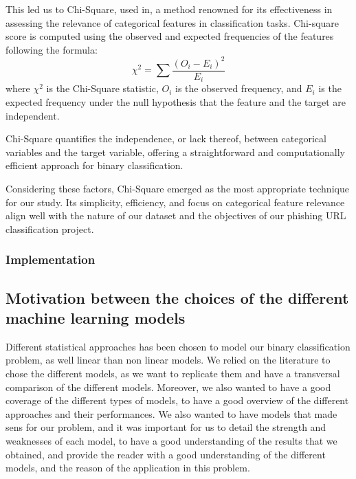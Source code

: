 \documentclass{article}
\begin{document}
    This led us to Chi-Square, used in\cite{LexicalFeatureSelection}, a method renowned for its effectiveness in assessing the relevance of categorical features in classification tasks.
    Chi-square score is computed using the observed and expected frequencies of the features following the formula:
    \begin{equation}
        \chi^2 = \sum \frac{(O_i - E_i)^2}{E_i}\label{eq:equation}
    \end{equation}
    where \( \chi^2 \) is the Chi-Square statistic, \( O_i \) is the observed frequency, and \( E_i \) is the expected frequency under the null hypothesis that the feature and the target are independent.

    Chi-Square quantifies the independence, or lack thereof, between categorical variables and the target variable, offering a straightforward and computationally efficient approach for binary classification.

    Considering these factors, Chi-Square emerged as the most appropriate technique for our study.
    Its simplicity, efficiency, and focus on categorical feature relevance align well with the nature of our dataset and the objectives of our phishing URL classification project.



    \subsubsection{Implementation}\label{subsubsec:implementation}


    \subsection{Motivation between the choices of the different machine learning models}\label{subsec:motivation-between-the-choices-of-the-different-machine-learning-models2}

    Different statistical approaches has been chosen to model our binary classification problem, as well linear than non linear models.
    We relied on the literature to chose the different models, as we want to replicate them and have a transversal comparison of the different models.
    Moreover, we also wanted to have a good coverage of the different types of models, to have a good overview of the different approaches and their performances.
    We also wanted to have models that made sens for our problem, and it was important for us to detail the strength and weaknesses of each model, to have a good understanding of the results that we obtained, and provide the reader with a good understanding of the different models, and the reason of the application in this problem.
\end{document}
